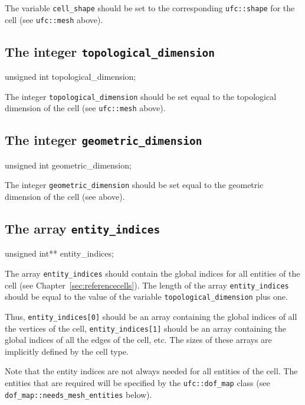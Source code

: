 The variable \texttt{cell\_shape} should be set to the corresponding
\texttt{ufc::shape} for the cell (see \texttt{ufc::mesh} above).

\subsection{The integer \texttt{topological\_dimension}}

\begin{code}
unsigned int topological_dimension;
\end{code}

The integer \texttt{topological\_dimension} should be set equal to the
topological dimension of the cell (see \texttt{ufc::mesh} above).


\subsection{The integer \texttt{geometric\_dimension}}

\begin{code}
unsigned int geometric_dimension;
\end{code}

The integer \texttt{geometric\_dimension} should be set equal to the
geometric dimension of the cell (see above).

\subsection{The array \texttt{entity\_indices}}

\begin{code}
unsigned int** entity_indices;
\end{code}

The array \texttt{entity\_indices} should contain the global indices
for all entities of the cell (see Chapter~\ref{sec:referencecells}).
The length of the array \texttt{entity\_indices} should be equal to
the value of the variable \texttt{topological\_dimension} plus one.

Thus, \texttt{entity\_indices[0]} should be an array containing the
global indices of all the vertices of the cell,
\texttt{entity\_indices[1]} should be an array containing the global
indices of all the edges of the cell, etc. The sizes of these arrays
are implicitly defined by the cell type.

Note that the entity indices are not always needed for all entities of
the cell. The entities that are required will be specified by the
\texttt{ufc::dof\_map} class (see \texttt{dof\_map::needs\_mesh\_entities} below).

